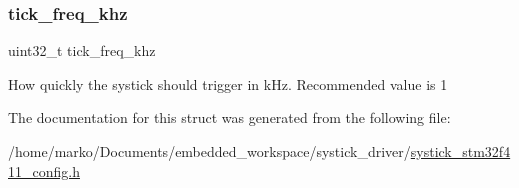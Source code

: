 \subsubsection{\texorpdfstring{tick\+\_\+freq\+\_\+khz}{tick\_freq\_khz}}
{\footnotesize\ttfamily uint32\+\_\+t tick\+\_\+freq\+\_\+khz}

How quickly the systick should trigger in k\+Hz. Recommended value is 1 

The documentation for this struct was generated from the following file\+:\begin{DoxyCompactItemize}
\item 
/home/marko/\+Documents/embedded\+\_\+workspace/systick\+\_\+driver/\hyperlink{systick__stm32f411__config_8h}{systick\+\_\+stm32f411\+\_\+config.\+h}\end{DoxyCompactItemize}
